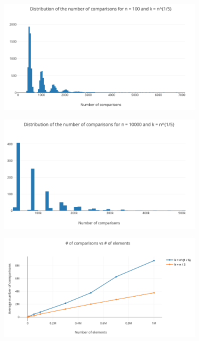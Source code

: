\documentclass[12pt,a4paper]{article}
\begin{document}
\begin{figure}[ht!]
  \centering
  \includegraphics[width=0.9\textwidth]{img/kroot5.png}
  \caption{}
  \label{fig:root5}
\end{figure}

\begin{figure}[ht!]
  \centering
  \includegraphics[width=0.9\textwidth]{img/kroot5-2.png}
  \caption{}
  \label{fig:root5-2}
\end{figure}

\begin{figure}[ht!]
  \centering
  \includegraphics[width=0.9\textwidth]{img/asym.png}
  \caption{}
  \label{fig:asym}
\end{figure}
\end{document}
